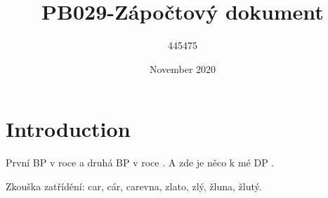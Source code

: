 \documentclass{article}
\title{PB029-Zápočtový dokument}
\author{445475 }
\date{November 2020}
\begin{document}
\maketitle




\section{Introduction}

První BP   \cite{Zouvala2018thesis} v roce \citeyear{Zouvala2018thesis} a druhá BP   \cite{Zouvala2020thesis} v roce \citeyear{Zouvala2020thesis}.
A zde je něco k mé DP  \cite{li2009haad}.

Zkouška zatřídění: car, cár, carevna,
                       zlato, zlý, žluna,
                       žlutý.

\printindex

\printbibliography[title = {Seznam bibliografických citací}] 
\end{document}
